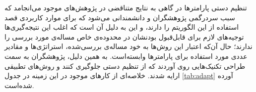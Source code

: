 \documentclass[12pt,a4paper]{article}
\theoremstyle{definition}
\theoremstyle{theorem}
\theoremstyle{definition}
\begin{document}
\newpage
{}



تنظیم دستی پارامترها در  گاهی به نتایج متناقضی در پژوهش‌های موجود می‌انجامد که سبب سردرگمی پژوهشگران و دانشمندانی می‌شود که برای موارد کاربردی قصد استفاده از این الگوریتم را دارند، و این به دلیل آن است که اغلب این نتیجه‌گیری‌ها توجیه‌های لازم برای قابل‌قبول بودنشان در محدوده‌ی خاص مساله‌ی مورد بررسی را ندارند؛ حال آن‌که اعتبار این روش‌ها به خود مساله‌ی بررسی‌شده، استراتژی‌ها و مقادیر عددی مورد استفاده برای پارامترها وابسته‌است. به همین دلیل، پژوهشگران به سمت طراحی تکنیک‌هایی روی آوردند که از تنظیم دستی جلوگیری کنند و روش‌های تطبیقی ارایه شدند. خلاصه‌ای از کارهای موجود در این زمینه در جدول \ref{tab:adapt} آورده شده‌است. 



\renewcommand{\arraystretch}{2}
\end{document}
